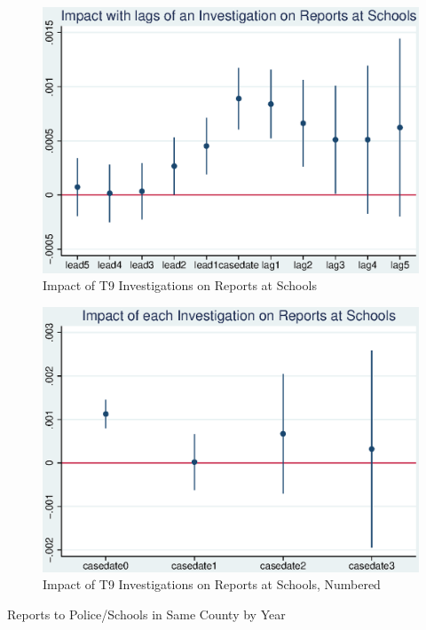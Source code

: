 \documentclass[AER,draftmode]{AEA}
\begin{document}
\begin{figure}
\includegraphics[width=4.9in]{figures/cases_schools_reports_lags.eps}

\caption{Impact of T9 Investigations on Reports at Schools}
\end{figure}

\begin{figure}
\includegraphics[width=4.9in]{figures/cases_school_reports_numbered.eps}

\caption{Impact of T9 Investigations on Reports at Schools, Numbered}

\end{figure}

\begin{table}
\caption{Reports to Police/Schools in Same County by Year}



\end{table}
\end{document}
